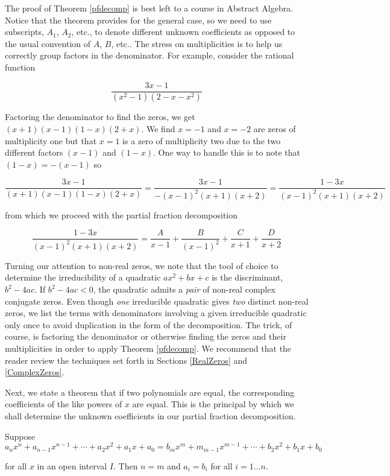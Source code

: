 \documentclass{ximera}
\begin{document}


 

The proof of Theorem \ref{pfdecomp} is best left to a course in Abstract Algebra.  Notice that the theorem provides for the general case, so we need to use subscripts, $A_1$, $A_2$, etc.,  to denote different unknown coefficients as opposed to the usual convention of $A$, $B$, etc..  The stress on multiplicities is to help us correctly group factors in the denominator.  For example, consider the rational function

\[\frac{3x-1}{\left(x^2-1\right)\left(2-x-x^2\right)}\]

Factoring the denominator to find the zeros, we get $(x+1)(x-1)(1-x)(2+x)$.  We find $x = -1$ and $x=-2$ are zeros of multiplicity one but that $x=1$ is a zero of multiplicity two due to the two different factors $(x-1)$ and $(1-x)$.  One way to handle this is to note that $(1-x) = -(x-1)$ so 

\[\frac{3x-1}{(x+1)(x-1)(1-x)(2+x)} = \frac{3x-1}{-(x-1)^2(x+1)(x+2)} = \frac{1-3x}{(x-1)^2(x+1)(x+2)}\]

from which we proceed with the partial fraction decomposition

\[\frac{1-3x}{(x-1)^2(x+1)(x+2)} = \frac{A}{x-1} + \frac{B}{(x-1)^2} + \frac{C}{x+1} + \frac{D}{x+2}\]

Turning our attention to non-real zeros, we note that the tool of choice to determine the irreducibility of a quadratic  $ax^2+bx+c$ is the discriminant, $b^2-4ac$.  If $b^2 - 4ac < 0$, the quadratic admits a \textit{pair} of non-real complex conjugate zeros.  Even though \textit{one} irreducible quadratic gives \textit{two} distinct non-real zeros, we list the terms with denominators involving a given irreducible quadratic only once to avoid duplication in the form of the decomposition.  The trick, of course, is factoring the denominator or otherwise finding the zeros and their multiplicities in order to apply Theorem \ref{pfdecomp}.  We recommend that the reader review the techniques set forth in Sections \ref{RealZeros} and \ref{ComplexZeros}. 

Next, we state a theorem that if two polynomials are equal, the corresponding coefficients of the like powers of $x$ are equal.  This is the principal by which we shall determine the unknown coefficients in our partial fraction decomposition.

 


\begin{theorem}  \label{polyequality} Suppose \[a_{n} x^{n} + a_{n-1} x^{n-1} + \cdots + a_2 x^2 + a_1 x + a_0 = b_{m} x^{m} + m_{m-1} x^{m-1} + \cdots + b_2 x^2 + b_1 x + b_0\]

for all $x$ in an open interval $I$.  Then $n=m$ and $a_{i} = b_{i}$ for all $i = 1 \ldots n$.


\end{theorem}
\end{document}
